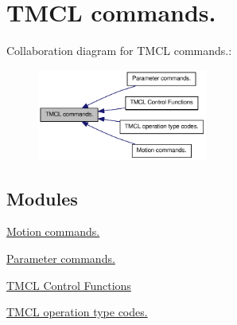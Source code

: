 \hypertarget{group__TMCLComm}{
\section{TMCL commands.}
\label{group__TMCLComm}
}


Collaboration diagram for TMCL commands.:\nopagebreak
\begin{figure}[H]
\begin{center}
\leavevmode
\includegraphics[width=158pt]{group__TMCLComm}
\end{center}
\end{figure}
\subsection*{Modules}
\begin{DoxyCompactItemize}
\item 
\hyperlink{group__MotionComm}{Motion commands.}
\item 
\hyperlink{group__ParComm}{Parameter commands.}
\item 
\hyperlink{group__CTLFuncs}{TMCL Control Functions}
\item 
\hyperlink{group__TypeCodes}{TMCL operation type codes.}
\end{DoxyCompactItemize}
